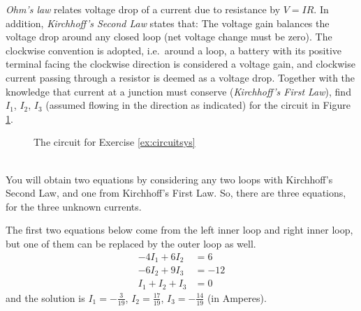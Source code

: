 \begin{Exercise}
\label{ex:circuitsys}
\textit{Ohm's law} relates voltage drop of a current due to resistance by $V=IR$. In addition, \textit{Kirchhoff’s Second Law} states that: The voltage gain balances the voltage drop around any closed loop (net voltage change must be zero). The clockwise convention is adopted, i.e.\ around a loop, a battery with its positive terminal facing the clockwise direction is considered a voltage gain, and clockwise current passing through a resistor is deemed as a voltage drop. Together with the knowledge that current at a junction must conserve (\textit{Kirchhoff's First Law}), find $I_1$, $I_2$, $I_3$ (assumed flowing in the direction as indicated) for the circuit in Figure \ref{fig:circuitsys}.
\begin{figure}[h!]
\centering
{}
\caption{The circuit for Exercise \ref{ex:circuitsys}}
\label{fig:circuitsys}
\end{figure}\\
You will obtain two equations by considering any two loops with Kirchhoff’s Second Law, and one from Kirchhoff's First Law. So, there are three equations, for the three unknown currents.
\end{Exercise}
\begin{Answer}
The first two equations below come from the left inner loop and right inner loop, but one of them can be replaced by the outer loop as well.
\begin{align*}
-4I_1 + 6I_2 &= 6\\
-6I_2 + 9I_3 &= -12\\
I_1 + I_2 + I_3 &= 0
\end{align*}
and the solution is $I_1 = -\frac{3}{19}$, $I_2 = \frac{17}{19}$, $I_3 = -\frac{14}{19}$ (in Amperes).
\end{Answer}

